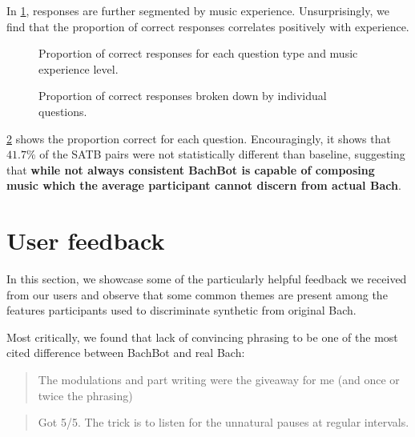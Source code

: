 In \cref{fig:responses-mask-musicExperience}, responses are further segmented
by music experience. Unsurprisingly, we find that the proportion of correct responses
correlates positively with experience.

\begin{figure}[tb]
  \centering
  
  \caption{Proportion of correct responses for each question type and music experience level.}
  \label{fig:responses-mask-musicExperience}
\end{figure}

\begin{figure}[tb]
  \centering
  
  \caption{Proportion of correct responses broken down by individual questions.}
  \label{fig:responses-name}
\end{figure}

\cref{fig:responses-name} shows the proportion correct for each question.
Encouragingly, it shows that $41.7\%$ of the SATB pairs were not
statistically different than baseline, suggesting that \textbf{while not always
consistent BachBot is capable of composing music which the average participant
cannot discern from actual Bach}.


\section{User feedback}

In this section, we showcase some of the particularly helpful feedback we
received from our users and observe that some common themes are present among
the features participants used to discriminate synthetic from original Bach.

Most critically, we found that lack of convincing phrasing to be one of the most
cited difference between BachBot and real Bach:
\begin{quote}
  The modulations and part writing were the giveaway for me (and once or twice the phrasing)
\end{quote}

\begin{quote}
  Got 5/5. The trick is to listen for the unnatural pauses at regular intervals.
\end{quote}

